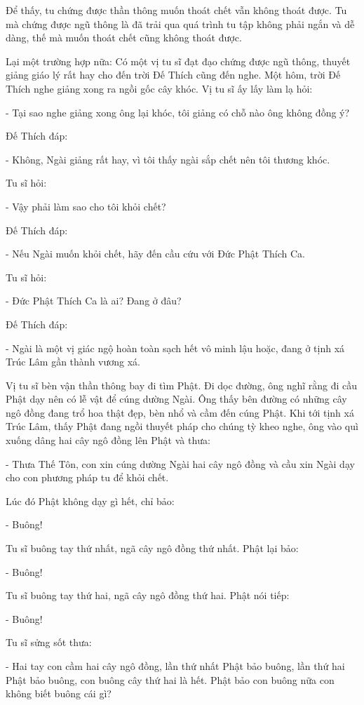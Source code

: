 \documentclass[
  12pt,
  oneside]{book}
\begin{document}
Để thấy, tu chứng được thần thông muốn thoát chết vẫn không thoát được. Tu mà chứng được ngũ thông là đã trải qua quá trình tu tập không phải ngắn và dễ dàng, thế mà muốn thoát chết cũng không thoát được.

Lại một trường hợp nữa: Có một vị tu sĩ đạt đạo chứng được ngũ thông, thuyết giảng giáo lý rất hay cho đến trời Đế Thích cũng đến nghe. Một hôm, trời Đế Thích nghe giảng xong ra ngồi gốc cây khóc. Vị tu sĩ ấy lấy làm lạ hỏi:

- Tại sao nghe giảng xong ông lại khóc, tôi giảng có chỗ nào ông không đồng ý?

Đế Thích đáp:

- Không, Ngài giảng rất hay, vì tôi thấy ngài sắp chết nên tôi thương khóc.

Tu sĩ hỏi:

- Vậy phải làm sao cho tôi khỏi chết?

Đế Thích đáp:

- Nếu Ngài muốn khỏi chết, hãy đến cầu cứu với Đức Phật Thích Ca.

Tu sĩ hỏi:

- Đức Phật Thích Ca là ai? Đang ở đâu?

Đế Thích đáp:

- Ngài là một vị giác ngộ hoàn toàn sạch hết vô minh lậu hoặc, đang ở tịnh xá Trúc Lâm gần thành vương xá.

Vị tu sĩ bèn vận thần thông bay đi tìm Phật. Đi dọc đường, ông nghĩ rằng đi cầu Phật dạy nên có lễ vật để cúng dường Ngài. Ông thấy bên đường có những cây ngô đồng đang trổ hoa thật đẹp, bèn nhổ và cầm đến cúng Phật. Khi tới tịnh xá Trúc Lâm, thấy Phật đang ngồi thuyết pháp cho chúng tỳ kheo nghe, ông vào quì xuống dâng hai cây ngô đồng lên Phật và thưa:

- Thưa Thế Tôn, con xin cúng dường Ngài hai cây ngô đồng và cầu xin Ngài dạy cho con phương pháp tu để khỏi chết.

Lúc đó Phật không dạy gì hết, chỉ bảo:

- Buông!

Tu sĩ buông tay thứ nhất, ngã cây ngô đồng thứ nhất. Phật lại bảo:

- Buông!

Tu sĩ buông tay thứ hai, ngã cây ngô đồng thứ hai. Phật nói tiếp:

- Buông!

Tu sĩ sửng sốt thưa:

- Hai tay con cầm hai cây ngô đồng, lần thứ nhất Phật bảo buông, lần thứ hai Phật bảo buông, con buông cây thứ hai là hết. Phật bảo con buông nữa con không biết buông cái gì?
\end{document}
